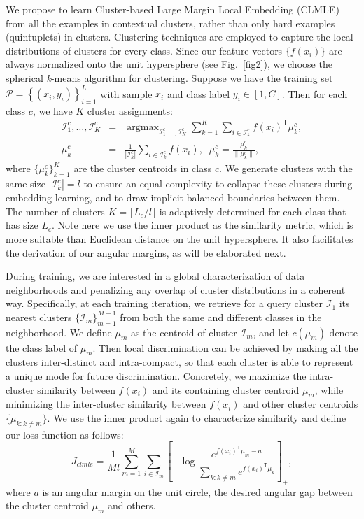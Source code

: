 \documentclass[10pt,journal,compsoc]{IEEEtran}
\DeclareMathOperator*{\argmax}{argmax}
\newcommand{\trans}[1]{{#1}^{\ensuremath{\mathsf{T}}}} %
\begin{document}
We propose to learn Cluster-based Large Margin Local Embedding (CLMLE) from all the examples in contextual clusters, rather than only hard examples (quintuplets) in clusters. Clustering techniques are employed to capture the local distributions of clusters for every class. Since our feature vectors $\{f(x_i)\}$ are always normalized onto the unit hypersphere (see Fig.~\ref{fig2}), we choose the spherical \textit{k}-means algorithm for clustering. Suppose we have the training set $\mathcal{P}=\left\{(x_i,y_i)\right\}_{i=1}^L$ with sample $x_i$ and class label $y_i \in [1,C]$. Then for each class $c$, we have $K$ cluster assignments:
\begin{eqnarray}
\label{eq6}
\mathcal{I}_1^c,\dots,\mathcal{I}_K^c &=& \argmax_{\mathcal{I}_1^c,\dots,\mathcal{I}_K^c} \sum_{k=1}^K \sum_{i\in \mathcal{I}_k^c} \trans{f(x_i)} \mu_k^c, \\
\mu_k^c &=& \frac{1}{|\mathcal{I}_k^c|} \sum_{i\in \mathcal{I}_k^c} f(x_i), \;\; \mu_k^c = \frac{\mu_k^c}{\| \mu_k^c\|},
\end{eqnarray}
where $\{\mu_k^c\}_{k=1}^K$ are the cluster centroids in class $c$. We generate clusters with the same size $|\mathcal{I}_k^c|=l$ to ensure an equal complexity to collapse these clusters during embedding learning, and to draw implicit balanced boundaries between them. The number of clusters $K = \lfloor L_c/l \rfloor$ is adaptively determined for each class that has size $L_c$. Note here we use the inner product as the similarity metric, which is more suitable than Euclidean distance on the unit hypersphere. It also facilitates the derivation of our angular margins, as will be elaborated next.

During training, we are interested in a global characterization of data neighborhoods and penalizing any overlap of cluster distributions in a coherent way. Specifically, at each training iteration, we retrieve for a query cluster $\mathcal{I}_1$ its nearest clusters $\{\mathcal{I}_m\}_{m=1}^{M-1}$ from both the same and different classes in the neighborhood. We define $\mu_m$ as the centroid of cluster $\mathcal{I}_m$, and let $c(\mu_m)$ denote the class label of $\mu_m$. Then local discrimination can be achieved by making all the clusters inter-distinct and intra-compact, so that each cluster is able to represent a unique mode for future discrimination. Concretely, we maximize the intra-cluster similarity between $f(x_i)$ and its containing cluster centroid $\mu_m$, while minimizing the inter-cluster similarity between $f(x_i)$ and other cluster centroids $\{\mu_{k:k\ne m}\}$. We use the inner product again to characterize similarity and define our loss function as follows:
\begin{equation}
\label{eq8}
J_{clmle} = \frac{1}{Ml} \sum_{m=1}^M \sum_{i \in \mathcal{I}_m} \left[ -\log \frac{e^{\trans{f(x_i)} \mu_m - a}} {\sum_{k: k\ne m} e^{\trans{f(x_i)} \mu_k}} \right]_+,
\end{equation}
where $a$ is an angular margin on the unit circle, the desired angular gap between the cluster centroid $\mu_m$ and others.
\end{document}
